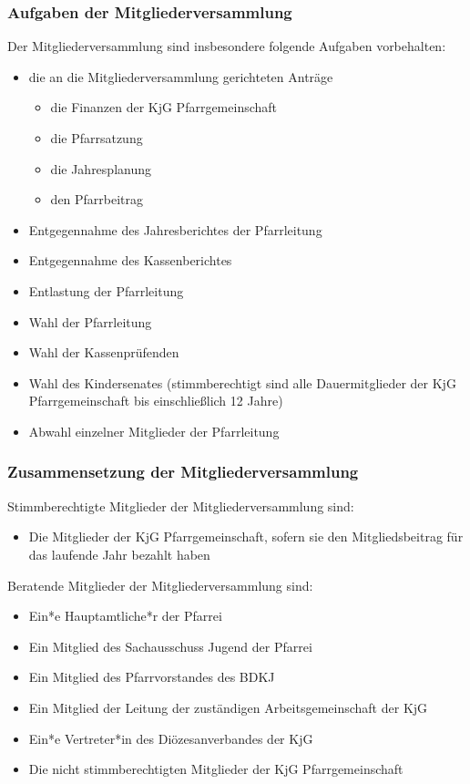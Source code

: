 \documentclass[12pt]{report}
\begin{document}
\begin{flushleft}
\subsubsection{Aufgaben der Mitgliederversammlung}
Der Mitgliederversammlung sind insbesondere folgende Aufgaben vorbehalten:
\begin{itemize}
  \item die an die Mitgliederversammlung gerichteten Anträge
    \begin{itemize}  
      \item die Finanzen der KjG Pfarrgemeinschaft
      \item die Pfarrsatzung
      \item die Jahresplanung
      \item den Pfarrbeitrag
    \end{itemize}
  \item Entgegennahme des Jahresberichtes der Pfarrleitung
  \item Entgegennahme des Kassenberichtes
  \item Entlastung der Pfarrleitung
  \item Wahl der Pfarrleitung
  \item Wahl der Kassenprüfenden
  \item Wahl des Kindersenates (stimmberechtigt sind alle Dauermitglieder der KjG Pfarrgemeinschaft bis einschließlich 12 Jahre)
  \item Abwahl einzelner Mitglieder der Pfarrleitung
\end{itemize}

\subsubsection{Zusammensetzung der Mitgliederversammlung}
Stimmberechtigte Mitglieder der Mitgliederversammlung sind:
\begin{itemize}
  \item Die Mitglieder der KjG Pfarrgemeinschaft, sofern sie den Mitgliedsbeitrag für das laufende Jahr bezahlt haben
\end{itemize}
Beratende Mitglieder der Mitgliederversammlung sind:
\begin{itemize}
  \item Ein*e Hauptamtliche*r der Pfarrei
  \item Ein Mitglied des Sachausschuss Jugend der Pfarrei
  \item Ein Mitglied des Pfarrvorstandes des BDKJ
  \item Ein Mitglied der Leitung der zuständigen Arbeitsgemeinschaft der KjG
  \item Ein*e Vertreter*in des Diözesanverbandes der KjG
  \item Die nicht stimmberechtigten Mitglieder der KjG Pfarrgemeinschaft
\end{itemize}

\end{flushleft}
\end{document}
